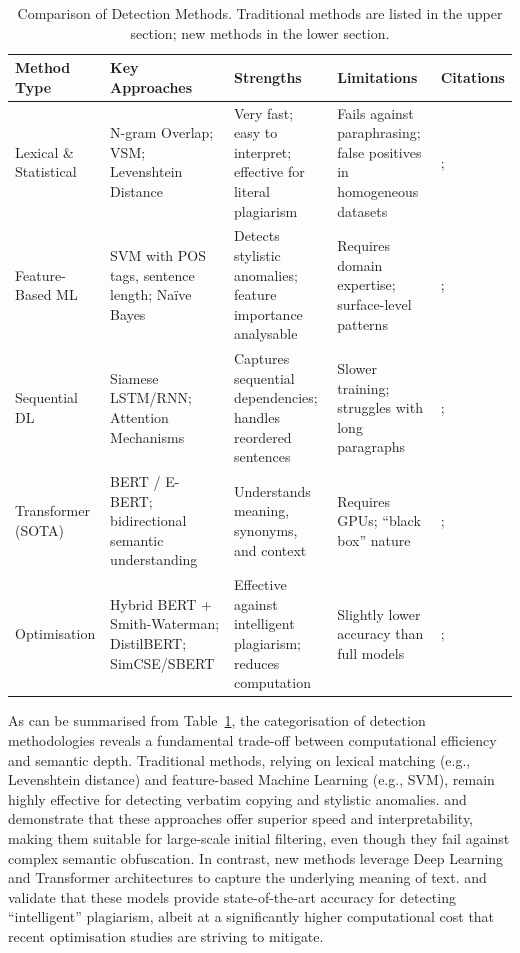 \documentclass[12pt, a4paper]{article}
\begin{document}
\begin{table}[htbp]
\centering
\caption{Comparison of Detection Methods. Traditional methods are listed in the upper section; new methods in the lower section.}
\label{tab:methods}
\footnotesize
\begin{tabular}{p{2cm}p{3.2cm}p{2.8cm}p{2.3cm}p{2cm}}
	\toprule
	\textbf{Method Type} & \textbf{Key Approaches} & \textbf{Strengths} & \textbf{Limitations} & \textbf{Citations} \\
	\midrule
	Lexical \& Statistical & N-gram Overlap; VSM; Levenshtein Distance & Very fast; easy to interpret; effective for literal plagiarism & Fails against paraphrasing; false positives in homogeneous datasets & \citet{Lieharyani2025}; \citet{ElRashidy2022} \\
	\midrule
	Feature-Based ML & SVM with POS tags, sentence length; Na\"ive Bayes & Detects stylistic anomalies; feature importance analysable & Requires domain expertise; surface-level patterns & \citet{ElRashidy2024}; \citet{Zahid2023} \\
	\midrule
	Sequential DL & Siamese LSTM/RNN; Attention Mechanisms & Captures sequential dependencies; handles reordered sentences & Slower training; struggles with long paragraphs & \citet{Bao2024}; \citet{Asalkar2025} \\
	\midrule
	Transformer (SOTA) & BERT / E-BERT; bidirectional semantic understanding & Understands meaning, synonyms, and context & Requires GPUs; ``black box'' nature & \citet{Antonius2023}; \citet{Sajid2025} \\
	\midrule
	Optimisation & Hybrid BERT + Smith-Waterman; DistilBERT; SimCSE/SBERT & Effective against intelligent plagiarism; reduces computation & Slightly lower accuracy than full models & \citet{Moravvej2023}; \citet{JingLiu2023} \\
	\bottomrule
\end{tabular}
\end{table}

As can be summarised from Table~\ref{tab:methods}, the categorisation of detection methodologies reveals a fundamental trade-off between computational efficiency and semantic depth. Traditional methods, relying on lexical matching (e.g., Levenshtein distance) and feature-based Machine Learning (e.g., SVM), remain highly effective for detecting verbatim copying and stylistic anomalies. \citet{ElRashidy2024} and \citet{Lieharyani2025} demonstrate that these approaches offer superior speed and interpretability, making them suitable for large-scale initial filtering, even though they fail against complex semantic obfuscation. In contrast, new methods leverage Deep Learning and Transformer architectures to capture the underlying meaning of text. \citet{Antonius2023} and \citet{Saqaabi2025} validate that these models provide state-of-the-art accuracy for detecting ``intelligent'' plagiarism, albeit at a significantly higher computational cost that recent optimisation studies \citep{JingLiu2023} are striving to mitigate.
\end{document}
